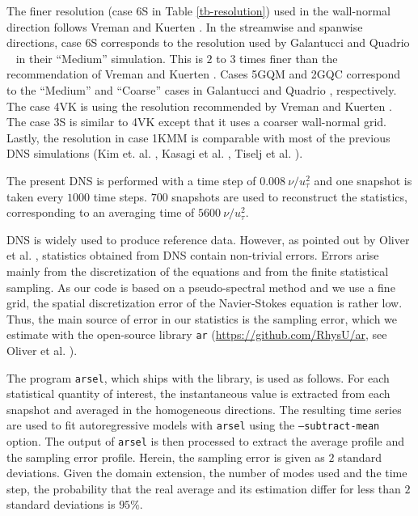 \documentclass[review]{elsarticle}
\newcommand{\gqcite}{Galantucci and Quadrio \cite{galantucci2010very}}
\begin{document}
The finer resolution (case 6S in Table \ref{tb-resolution}) used in the wall-normal direction follows Vreman and Kuerten \cite{vreman2014comparison}. In the streamwise and spanwise directions, case 6S corresponds to the resolution used by \gqcite ~ in their ``Medium'' simulation. This is $2$ to $3$ times finer than the recommendation of Vreman and Kuerten \cite{vreman2014comparison}. Cases 5GQM and 2GQC correspond to the ``Medium'' and ``Coarse'' cases in \gqcite, respectively. The case 4VK is using the resolution recommended by Vreman and Kuerten \cite{vreman2014comparison}. The case 3S is similar to 4VK except that it uses a coarser wall-normal grid. Lastly, the resolution in case 1KMM is comparable with most of the previous DNS simulations (Kim et. al. \cite{kim1987turbulence}, Kasagi et al. \cite{kasagi1991direct}, Tiselj et al. \cite{tiselj2001effect}).

The present DNS is performed with a time step of $0.008 ~ \nu / u_\tau^2$ and one snapshot is taken every $\num{1 000}$ time steps. $700$ snapshots are used to reconstruct the statistics, corresponding to an averaging time of $\num{5 600} ~ \nu / u_\tau^2$.

DNS is widely used to produce reference data. However, as pointed out by Oliver et al. \cite{oliver2014estimating}, statistics obtained from DNS contain non-trivial errors. Errors arise mainly from the discretization of the equations and from the finite statistical sampling. As our code is based on a pseudo-spectral method and we use a fine grid, the spatial discretization error of the Navier-Stokes equation is rather low. Thus, the main source of error in our statistics is the sampling error, which we estimate with the open-source library \texttt{ar} (\url{https://github.com/RhysU/ar}, see Oliver et al. \cite{oliver2014estimating}).

The program \texttt{arsel}, which ships with the library, is used as follows. For each statistical quantity of interest, the instantaneous value is extracted from each snapshot and averaged in the homogeneous directions. The resulting time series are used to fit autoregressive models with \texttt{arsel} using the \texttt{--subtract-mean} option. The output of \texttt{arsel} is then processed to extract the average profile and the sampling error profile. Herein, the sampling error is given as $2$ standard deviations. Given the domain extension, the number of modes used and the time step, the probability that the real average and its estimation differ for less than $2$ standard deviations is $95\%$.
\end{document}
